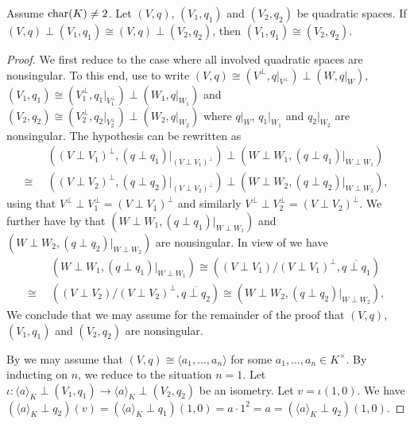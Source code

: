 \documentclass[12pt, leqno, british]{amsart}
\begin{document}
\begin{thm}\label{T:Witt-Cancellation}
Assume $\operatorname{char}(K) \neq 2$.
Let $(V, q)$, $(V_1, q_1)$ and $(V_2, q_2)$ be quadratic spaces.
If $(V, q) \perp (V_1, q_1) \cong (V, q) \perp (V_2, q_2)$, then $(V_1, q_1) \cong (V_2, q_2)$.
\end{thm}
\begin{proof}
We first reduce to the case where all involved quadratic spaces are nonsingular.
To this end, use  to write $(V, q) \cong (V^\perp, q\vert_{V^\perp}) \perp (W, q\vert_W)$, $(V_1, q_1) \cong (V_1^\perp, q_1\vert_{V_1^\perp}) \perp (W_1, q\vert_{W_1})$ and $(V_2, q_2) \cong (V_2^\perp, q_2\vert_{V_2^\perp}) \perp (W_2, q\vert_{W_2})$ where $q\vert_W$, $q_1\vert_{W_1}$ and $q_2\vert_{W_2}$ are nonsingular.
The hypothesis can be rewritten as
\begin{align*}
&((V \perp V_1)^\perp, (q \perp q_1)\vert_{(V \perp V_1)^\perp}) \perp (W \perp W_1, (q \perp q_1)\vert_{W \perp W_1}) \\
\cong\enspace &((V \perp V_2)^\perp, (q \perp q_2)\vert_{(V \perp V_2)^\perp}) \perp (W \perp W_2, (q \perp q_2)\vert_{W \perp W_2}),
\end{align*}
using that $V^\perp \perp V_1^\perp = (V \perp V_1)^\perp$ and similarly $V^\perp \perp V_2^\perp = (V \perp V_2)^\perp$.
We further have by  that $(W \perp W_1, (q \perp q_1)\vert_{W \perp W_1})$ and $(W \perp W_2, (q \perp q_2)\vert_{W \perp W_2})$ are nonsingular.
In view of  we have
\begin{align*}
&(W \perp W_1, (q \perp q_1)\vert_{W \perp W_1}) \cong ((V \perp V_1)/(V \perp V_1)^\perp, \overline{q \perp q_1}) \\
\cong\enspace &((V \perp V_2)/(V \perp V_2)^\perp, \overline{q \perp q_2}) \cong (W \perp W_2, (q \perp q_2)\vert_{W \perp W_2}),
\end{align*}
We conclude that we may assume for the remainder of the proof that $(V, q)$, $(V_1, q_1)$ and $(V_2, q_2)$ are nonsingular.

By  we may assume that $(V, q) \cong \langle a_1, \ldots, a_n \rangle$ for some $a_1, \ldots, a_n \in K^\times$.
By inducting on $n$, we reduce to the situation $n = 1$.
Let $\iota : \langle a \rangle_K \perp (V_1, q_1) \to \langle a \rangle_K \perp (V_2, q_2)$ be an isometry.
Let $v = \iota(1, 0)$.
We have $(\langle a \rangle_K \perp q_2)(v) = (\langle a \rangle_K \perp q_1)(1 , 0) = a\cdot 1^2 = a = (\langle a \rangle_K \perp q_2)(1, 0)$.


\end{proof}
\end{document}
